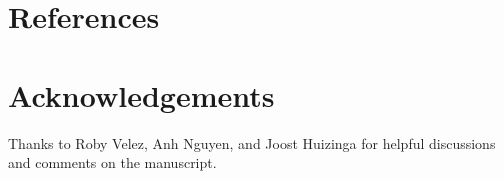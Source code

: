 \documentclass[twocolumn, DIV25, 9pt]{scrartcl}
\begin{document}
%
%
%
%
%
%
%
%
%
%
%
%
%
%
%
%

\section{References}
\begin{small}
\sffamily

\end{small}

\section{Acknowledgements} Thanks to Roby Velez, Anh Nguyen, and Joost Huizinga for helpful discussions and comments on the manuscript. 
\end{document}
